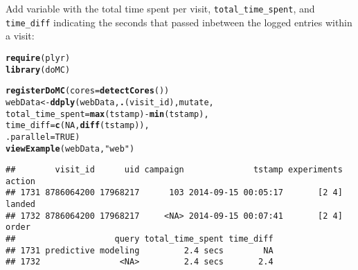 \documentclass{article}\usepackage[]{graphicx}\usepackage[]{color}
\makeatletter
\newcommand{\hlnum}[1]{\textcolor[rgb]{0.686,0.059,0.569}{#1}}%
\newcommand{\hlstr}[1]{\textcolor[rgb]{0.192,0.494,0.8}{#1}}%
\newcommand{\hlopt}[1]{\textcolor[rgb]{0,0,0}{#1}}%
\newcommand{\hlstd}[1]{\textcolor[rgb]{0.345,0.345,0.345}{#1}}%
\newcommand{\hlkwb}[1]{\textcolor[rgb]{0.69,0.353,0.396}{#1}}%
\newcommand{\hlkwc}[1]{\textcolor[rgb]{0.333,0.667,0.333}{#1}}%
\newcommand{\hlkwd}[1]{\textcolor[rgb]{0.737,0.353,0.396}{\textbf{#1}}}%
\newenvironment{kframe}{%
 \def\at@end@of@kframe{}%
 \ifinner\ifhmode%
  \def\at@end@of@kframe{\end{minipage}}%
  \begin{minipage}{\columnwidth}%
 \fi\fi%
 \def\FrameCommand##1{\hskip\@totalleftmargin \hskip-\fboxsep
 \colorbox{shadecolor}{##1}\hskip-\fboxsep
     \hskip-\linewidth \hskip-\@totalleftmargin \hskip\columnwidth}%
 \MakeFramed {\advance\hsize-\width
   \@totalleftmargin\z@ \linewidth\hsize
   \@setminipage}}%
 {\par\unskip\endMakeFramed%
 \at@end@of@kframe}
\newenvironment{knitrout}{}{} %
\makeatother
\begin{document}
Add variable with the total time spent per visit, \verb+total_time_spent+, and \verb+time_diff+ indicating the seconds that passed inbetween the logged entries within a visit:
\begin{knitrout}
\color{fgcolor}\begin{kframe}
\begin{alltt}
\hlkwd{require}\hlstd{(plyr)}
\hlkwd{library}\hlstd{(doMC)}
\end{alltt}


{\ttfamily\noindent\itshape\color{messagecolor}{\#\# Loading required package: foreach\\\#\# Loading required package: iterators\\\#\# Loading required package: parallel}}\begin{alltt}
\hlkwd{registerDoMC}\hlstd{(}\hlkwc{cores}\hlstd{=}\hlkwd{detectCores}\hlstd{())}
\hlstd{webData} \hlkwb{<-} \hlkwd{ddply}\hlstd{(webData,} \hlkwd{.}\hlstd{(visit_id), mutate,}
                 \hlkwc{total_time_spent}\hlstd{=}\hlkwd{max}\hlstd{(tstamp)}\hlopt{-}\hlkwd{min}\hlstd{(tstamp),}
                 \hlkwc{time_diff}\hlstd{=}\hlkwd{c}\hlstd{(}\hlnum{NA}\hlstd{,}\hlkwd{diff}\hlstd{(tstamp)),}
                 \hlkwc{.parallel}\hlstd{=}\hlnum{TRUE}\hlstd{)}
\hlkwd{viewExample}\hlstd{(webData,}\hlstr{"web"}\hlstd{)}
\end{alltt}
\begin{verbatim}
##        visit_id      uid campaign              tstamp experiments action
## 1731 8786064200 17968217      103 2014-09-15 00:05:17       [2 4] landed
## 1732 8786064200 17968217     <NA> 2014-09-15 00:07:41       [2 4]  order
##                    query total_time_spent time_diff
## 1731 predictive modeling         2.4 secs        NA
## 1732                <NA>         2.4 secs       2.4
\end{verbatim}
\end{kframe}
\end{knitrout}
\end{document}
